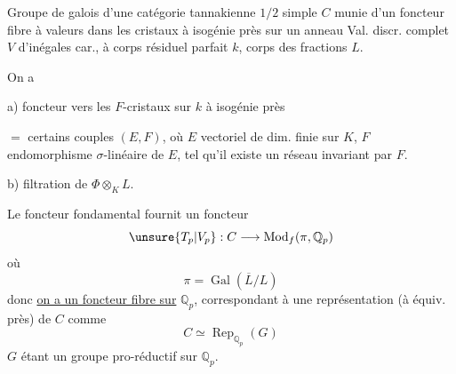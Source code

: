 
Groupe de galois d'une catégorie tannakienne   $1/2$ simple $C$ munie d'un foncteur fibre à valeurs dans les cristaux  à isogénie près sur un anneau   Val. discr. complet $V$ d'inégales car., à corps résiduel parfait $k$, corps des fractions $L$.

On a

a) foncteur  vers les $F$-cristaux sur $k$ à isogénie près

$=$ certains couples $(E,F)$, où $E$ vectoriel de dim. finie sur $K$, $F$ endomorphisme $\sigma$-linéaire de $E$, tel qu'il existe un réseau invariant par $F$.

b) filtration de $\Phi\otimes_K L$.


Le foncteur fondamental  fournit un foncteur
\[
\unsure{T_p|V_p}:C\longrightarrow\operatorname{Mod}_f(\pi,\mathbb Q_p)
\]
où
\[
\pi=\operatorname{Gal}(\overline L/L)
\]
donc \uline{on a un foncteur fibre sur} $\mathbb Q_p$, correspondant à une représentation (à équiv. près) de $C$ comme
\[
C\simeq\operatorname{Rep}_{\mathbb Q_p}(G)
\]
$\boxed{G}$ étant un groupe pro-réductif sur $\mathbb Q_p$.

